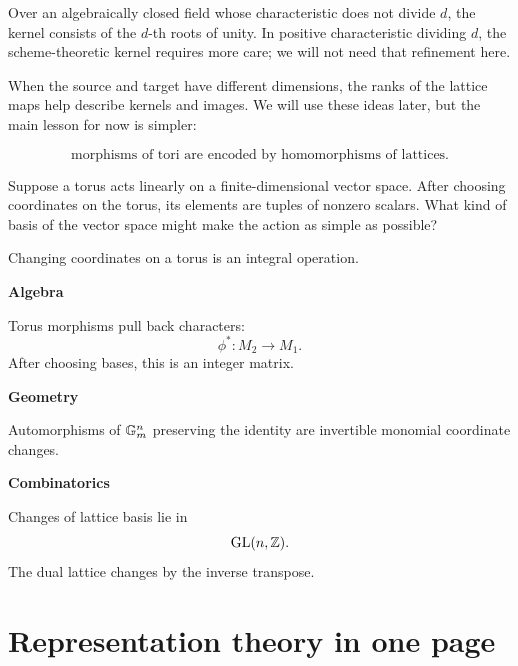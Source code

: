 Over an algebraically closed field whose characteristic does not
divide \(d\), the kernel consists of the \(d\)-th roots of unity. In
positive characteristic dividing \(d\), the scheme-theoretic kernel
requires more care; we will not need that refinement here.

When the source and target have different dimensions, the ranks of
the lattice maps help describe kernels and images. We will use these
ideas later, but the main lesson for now is simpler:

\[
\boxed{
\text{morphisms of tori are encoded by homomorphisms of lattices.}
}
\]

\begin{guidingquestion}
Suppose a torus acts linearly on a finite-dimensional vector space.
After choosing coordinates on the torus, its elements are tuples of
nonzero scalars. What kind of basis of the vector space might make the
action as simple as possible?
\end{guidingquestion}

\begin{threedictionaries}
Changing coordinates on a torus is an integral operation.

\medskip

\noindent
\begin{minipage}[t]{0.30\linewidth}
\centering
\textbf{Algebra}\par
\smallskip
Torus morphisms pull back characters:
\[
\phi^*:M_2\to M_1.
\]
After choosing bases, this is an integer matrix.
\end{minipage}
\hfill
\begin{minipage}[t]{0.30\linewidth}
\centering
\textbf{Geometry}\par
\smallskip
Automorphisms of \(\mathbb{G}_{m}^n\) preserving the identity are invertible
monomial coordinate changes.
\end{minipage}
\hfill
\begin{minipage}[t]{0.30\linewidth}
\centering
\textbf{Combinatorics}\par
\smallskip
Changes of lattice basis lie in
\[
\operatorname{GL}(n,\mathbb{Z}).
\]
The dual lattice changes by the inverse transpose.
\end{minipage}
\end{threedictionaries}



\section{Representation theory in one page}
\label{sec:torus-representation-theory}

